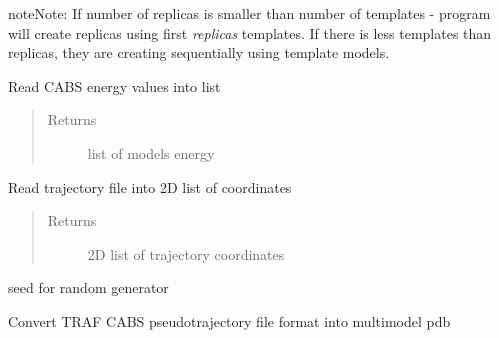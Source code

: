 \documentclass[letterpaper,10pt,english]{sphinxmanual}
\begin{document}
\begin{fulllineitems}
\begin{fulllineitems}
\begin{notice}{note}{Note:}
If number of replicas is smaller than number of templates - program will create replicas using first \emph{replicas} templates. If there is less templates than replicas, they are creating sequentially using template models.
\end{notice}

\end{fulllineitems}


\begin{fulllineitems}
\label{api:pycabs.CABS.getEnergy}
Read CABS energy values into list
\begin{quote}\begin{description}
\item[{Returns}] \leavevmode
list of models energy

\end{description}\end{quote}

\end{fulllineitems}


\begin{fulllineitems}
\label{api:pycabs.CABS.getTraCoordinates}
Read trajectory file into 2D list of coordinates
\begin{quote}\begin{description}
\item[{Returns}] \leavevmode
2D list of trajectory coordinates

\end{description}\end{quote}

\end{fulllineitems}


\begin{fulllineitems}
\label{api:pycabs.CABS.rng_seed}
seed for random generator

\end{fulllineitems}


\begin{fulllineitems}
\label{api:pycabs.CABS.trafToPdb}
Convert TRAF CABS pseudotrajectory file format into multimodel pdb

\end{fulllineitems}


\end{fulllineitems}
\end{document}
